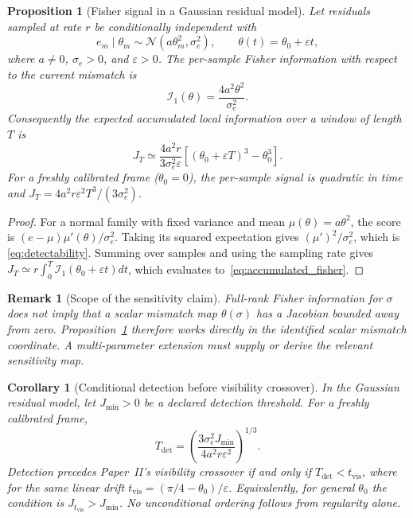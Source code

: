 \documentclass[12pt]{article}
\newtheorem{proposition}[theorem]{Proposition}
\newtheorem{remark}[theorem]{Remark}
\newtheorem{corollary}[theorem]{Corollary}
\begin{document}
\begin{proposition}[Fisher signal in a Gaussian residual model]
\label{prop:gaussian_fisher}
Let residuals sampled at rate $r$ be conditionally independent with
\begin{equation}
\label{eq:gaussian_residual}
e_m\mid\theta_m\sim\mathcal N(a\theta_m^2,\sigma_e^2),
\qquad \theta(t)=\theta_0+\varepsilon t,
\end{equation}
where $a\neq0$, $\sigma_e>0$, and $\varepsilon>0$.  The per-sample
Fisher information with respect to the current mismatch is
\begin{equation}
\label{eq:detectability}
\mathcal I_1(\theta)=\frac{4a^2\theta^2}{\sigma_e^2}.
\end{equation}
Consequently the expected accumulated local information over a window
of length $T$ is
\begin{equation}
\label{eq:accumulated_fisher}
J_T\simeq\frac{4a^2r}{3\sigma_e^2\varepsilon}
\left[(\theta_0+\varepsilon T)^3-\theta_0^3\right].
\end{equation}
For a freshly calibrated frame ($\theta_0=0$), the per-sample signal is
quadratic in time and $J_T=4a^2r\varepsilon^2T^3/(3\sigma_e^2)$.
\end{proposition}

\begin{proof}
For a normal family with fixed variance and mean
$\mu(\theta)=a\theta^2$, the score is
$(e-\mu)\mu'(\theta)/\sigma_e^2$.  Taking its squared
expectation gives $(\mu')^2/\sigma_e^2$, which is
\eqref{eq:detectability}.  Summing over samples and using the sampling
rate gives
$J_T\simeq r\int_0^T\mathcal I_1(\theta_0+\varepsilon t)dt$,
which evaluates to~\eqref{eq:accumulated_fisher}.
\end{proof}

\begin{remark}[Scope of the sensitivity claim]
\label{rem:fisher_sensitivity_scope}
Full-rank Fisher information for $\sigma$ does not imply that a scalar
mismatch map $\theta(\sigma)$ has a Jacobian bounded away from zero.
Proposition~\ref{prop:gaussian_fisher} therefore works directly in the
identified scalar mismatch coordinate.  A multi-parameter extension
must supply or derive the relevant sensitivity map.
\end{remark}

\begin{corollary}[Conditional detection before visibility crossover]
\label{cor:detection_window}
In the Gaussian residual model, let $J_{\min}>0$ be a declared
detection threshold.  For a freshly calibrated frame,
\begin{equation}
\label{eq:detection_window}
T_{\mathrm{det}}
=\left(\frac{3\sigma_e^2J_{\min}}
  {4a^2r\varepsilon^2}\right)^{1/3}.
\end{equation}
Detection precedes Paper~II's visibility crossover if and only if
$T_{\mathrm{det}}<t_{\mathrm{vis}}$, where for the same linear drift
$t_{\mathrm{vis}}=(\pi/4-\theta_0)/\varepsilon$.  Equivalently, for
general $\theta_0$ the condition is
$J_{t_{\mathrm{vis}}}>J_{\min}$.  No unconditional ordering follows
from regularity alone.
\end{corollary}
\end{document}
